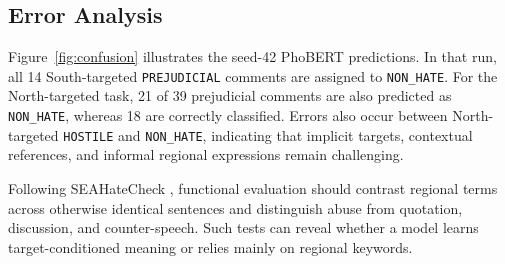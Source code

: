 \documentclass[11pt]{article}
\begin{document}
\begin{table}[H]
\centering
\small
\caption{Test results over seeds 42, 43, and 44 (mean $\pm$ sample SD) on a fixed split, rounded to two decimal places. N/S denote North- and South-targeted tasks; the best mean macro-F1 values are bold. The deterministic majority baseline always predicts \texttt{NON\_HATE}. A displayed SD of 0.00 may be nonzero before rounding.}
\label{tab:results}
\end{table}

\subsection{Error Analysis}

Figure~\ref{fig:confusion} illustrates the seed-42 PhoBERT predictions. In that run, all 14 South-targeted \texttt{PREJUDICIAL} comments are assigned to \texttt{NON\_HATE}. For the North-targeted task, 21 of 39 prejudicial comments are also predicted as \texttt{NON\_HATE}, whereas 18 are correctly classified. Errors also occur between North-targeted \texttt{HOSTILE} and \texttt{NON\_HATE}, indicating that implicit targets, contextual references, and informal regional expressions remain challenging.

Following SEAHateCheck \cite{ng2026seahatecheck}, functional evaluation should contrast regional terms across otherwise identical sentences and distinguish abuse from quotation, discussion, and counter-speech. Such tests can reveal whether a model learns target-conditioned meaning or relies mainly on regional keywords.
\end{document}
